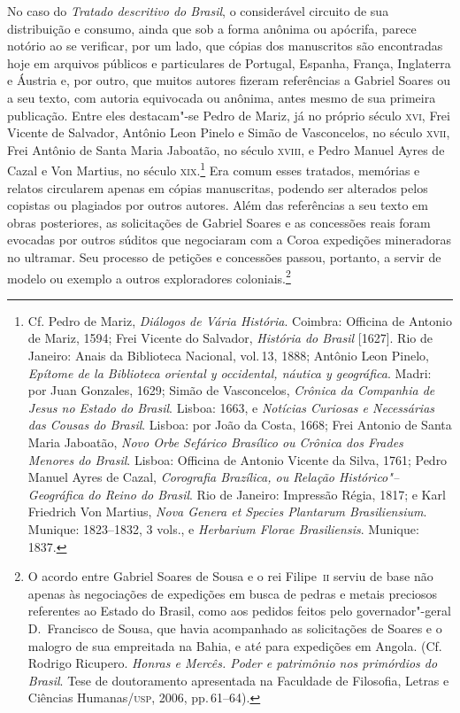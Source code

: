 \documentclass[12pt]{extarticle}
\begin{document}
{No caso do \textit{Tratado descritivo do Brasil}, o considerável
circuito de sua distribuição e consumo, ainda que sob a forma anônima
ou apócrifa, parece notório ao se verificar, por um lado, que cópias
dos manuscritos são encontradas hoje em arquivos públicos e
particulares de Portugal, Espanha, França, Inglaterra e Áustria e, por
outro, que muitos autores fizeram referências a Gabriel Soares ou a seu
texto, com autoria equivocada ou anônima, antes mesmo de sua primeira
publicação. Entre eles destacam"-se Pedro de Mariz, já no próprio século
\textsc{xvi}, Frei Vicente de Salvador, Antônio Leon Pinelo e Simão de
Vasconcelos, no século \textsc{xvii}, Frei Antônio de Santa Maria Jaboatão, no
século \textsc{xviii}, e Pedro Manuel Ayres de Cazal e Von Martius, no século
\textsc{xix}.\footnote{ Cf. Pedro de Mariz, \textit{Diálogos de Vária História}.
Coimbra: Officina de Antonio de Mariz, 1594; Frei Vicente do
Salvador,\textit{ História do Brasil} [1627]. Rio de Janeiro: Anais da
Biblioteca Nacional, vol.\,13, 1888; Antônio Leon Pinelo, \textit{Epítome
de la Biblioteca oriental y occidental, náutica y geográfica}. Madri:
por Juan Gonzales, 1629;  Simão de Vasconcelos, \textit{Crônica
da Companhia de Jesus no Estado do Brasil}. Lisboa: 1663, e
\textit{Notícias Curiosas e Necessárias das Cousas do Brasil}. Lisboa:
por João da Costa, 1668; Frei Antonio de Santa Maria Jaboatão,
\textit{Novo Orbe Sefárico Brasílico ou Crônica dos Frades Menores do
Brasil}. Lisboa: Officina de Antonio Vicente da Silva, 1761; 
Pedro Manuel Ayres de Cazal, \textit{Corografia Brazílica, ou Relação
Histórico"--Geográfica do Reino do Brasil}. Rio de Janeiro: Impressão
Régia, 1817; e Karl Friedrich Von Martius,
\textit{Nova Genera et Species Plantarum
Brasiliensium}. Munique: 1823--1832, 3 vols., e \textit{Herbarium
Florae Brasiliensis}. Munique: 1837.} Era comum esses tratados,
memórias e relatos circularem apenas em cópias manuscritas, podendo ser
alterados pelos copistas ou plagiados por outros autores. Além das
referências a seu texto em obras posteriores, as solicitações de
Gabriel Soares e as concessões reais foram evocadas por outros súditos
que negociaram com a Coroa expedições mineradoras no ultramar. Seu
processo de petições e concessões passou, portanto, a servir de modelo
ou exemplo a outros exploradores coloniais.\footnote{ O acordo entre
Gabriel Soares de Sousa e o rei Filipe~\textsc{ii} serviu de base não apenas
às negociações de expedições em busca de pedras e metais preciosos
referentes ao Estado do Brasil, como aos pedidos feitos pelo 
governador"-geral D.~Francisco de Sousa, que havia acompanhado as
solicitações de Soares e o malogro de sua empreitada na Bahia, e até
para expedições em Angola. (Cf. Rodrigo Ricupero. \textit{Honras e Mercês.
Poder e patrimônio nos primórdios do Brasil}. Tese de doutoramento apresentada
na Faculdade de Filosofia, Letras e Ciências Humanas/\textsc{usp}, 2006, pp.\,61--64).}

}
\end{document}
